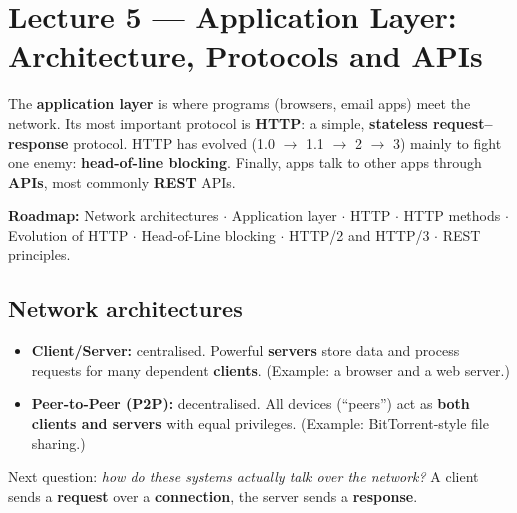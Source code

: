\chapter{Lecture 5 --- Application Layer: Architecture, Protocols and APIs}

\begin{keyidea}
The \textbf{application layer} is where programs (browsers, email apps) meet the network. Its most important protocol is \textbf{HTTP}: a simple, \textbf{stateless request--response} protocol. HTTP has evolved (1.0 $\to$ 1.1 $\to$ 2 $\to$ 3) mainly to fight one enemy: \textbf{head-of-line blocking}. Finally, apps talk to other apps through \textbf{APIs}, most commonly \textbf{REST} APIs.
\end{keyidea}

\textbf{Roadmap:} Network architectures $\cdot$ Application layer $\cdot$ HTTP $\cdot$ HTTP methods $\cdot$ Evolution of HTTP $\cdot$ Head-of-Line blocking $\cdot$ HTTP/2 and HTTP/3 $\cdot$ REST principles.

\section{Network architectures}

\begin{center}
\end{center}

\begin{itemize}
  \item \textbf{Client/Server:} centralised. Powerful \textbf{servers} store data and process requests for many dependent \textbf{clients}. (Example: a browser and a web server.)
  \item \textbf{Peer-to-Peer (P2P):} decentralised. All devices (``peers'') act as \textbf{both clients and servers} with equal privileges. (Example: BitTorrent-style file sharing.)
\end{itemize}
Next question: \emph{how do these systems actually talk over the network?} A client sends a \textbf{request} over a \textbf{connection}, the server sends a \textbf{response}.

